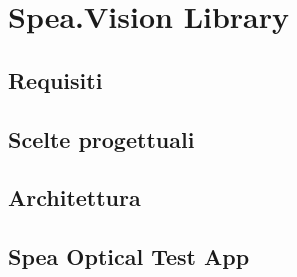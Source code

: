 \chapter{Spea.Vision Library}
\section{Requisiti}
\section{Scelte progettuali}
\section{Architettura}
\section{Spea Optical Test App}
